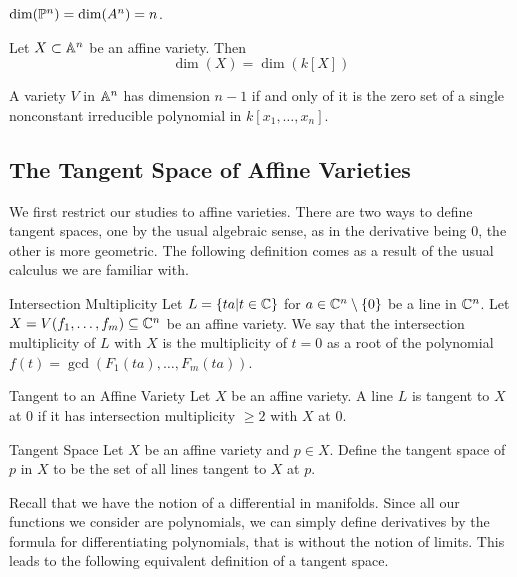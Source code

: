 \documentclass[a4paper]{article}
\begin{document}
\begin{lmm}{}{} $\dim(\mathbb{P}^n)=\dim(A^n)=n$. 
\end{lmm}

\begin{thm}{}{} Let $X\subset\mathbb{A}^n$ be an affine variety. Then $$\dim(X)=\dim(k[X])$$
\end{thm}

\begin{prp}{}{} A variety $V$ in $\mathbb{A}^n$ has dimension $n-1$ if and only of it is the zero set of a single nonconstant irreducible polynomial in $k[x_1,\dots,x_n]$. 
\end{prp}

\subsection{The Tangent Space of Affine Varieties}
We first restrict our studies to affine varieties. There are two ways to define tangent spaces, one by the usual algebraic sense, as in the derivative being $0$, the other is more geometric. The following definition comes as a result of the usual calculus we are familiar with. 

\begin{defn}{Intersection Multiplicity}{} Let $L=\{ta|t\in\mathbb{C}\}$ for $a\in\mathbb{C}^n\setminus\{0\}$ be a line in $\mathbb{C}^n$. Let $X=V(f_1,\dots,f_m)\subseteq\mathbb{C}^n$ be an affine variety. We say that the intersection multiplicity of $L$ with $X$ is the multiplicity of $t=0$ as a root of the polynomial $f(t)=\gcd(F_1(ta),\dots,F_m(ta))$. 
\end{defn}

\begin{defn}{Tangent to an Affine Variety}{} Let $X$ be an affine variety. A line $L$ is tangent to $X$ at $0$ if it has intersection multiplicity $\geq 2$ with $X$ at $0$. 
\end{defn}

\begin{defn}{Tangent Space}{} Let $X$ be an affine variety and $p\in X$. Define the tangent space of $p$ in $X$ to be the set of all lines tangent to $X$ at $p$. 
\end{defn}

Recall that we have the notion of a differential in manifolds. Since all our functions we consider are polynomials, we can simply define derivatives by the formula for differentiating polynomials, that is without the notion of limits. This leads to the following equivalent definition of a tangent space. 
\end{document}
